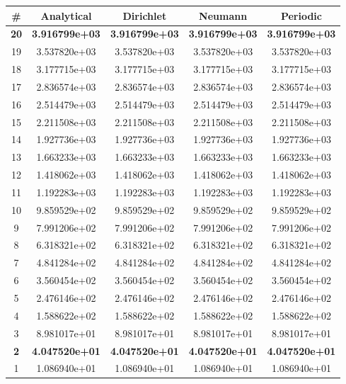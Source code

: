 \begin{tabular}{@{\extracolsep{4pt}}c c c c c}
	\toprule
	\textbf{\#} & \textbf{Analytical} &	  \textbf{Dirichlet} & \textbf{Neumann} & \textbf{Periodic}  \\
	\midrule
		\textbf{20} & \textbf{3.916799e+03} & \textbf{3.916799e+03} & \textbf{3.916799e+03} & \textbf{3.916799e+03} \\
		19 & 3.537820e+03 &	3.537820e+03 & 3.537820e+03 & 3.537820e+03 \\
		18 & 3.177715e+03 &	3.177715e+03 & 3.177715e+03 & 3.177715e+03 \\
		17 & 2.836574e+03 &	2.836574e+03 & 2.836574e+03 & 2.836574e+03 \\
		16 & 2.514479e+03 &	2.514479e+03 & 2.514479e+03 & 2.514479e+03 \\
		15 & 2.211508e+03 &	2.211508e+03 & 2.211508e+03 & 2.211508e+03 \\
		14 & 1.927736e+03 &	1.927736e+03 & 1.927736e+03 & 1.927736e+03 \\
		13 & 1.663233e+03 &	1.663233e+03 & 1.663233e+03 & 1.663233e+03 \\
		12 & 1.418062e+03 &	1.418062e+03 & 1.418062e+03 & 1.418062e+03 \\
		11 & 1.192283e+03 &	1.192283e+03 & 1.192283e+03 & 1.192283e+03 \\
		10 & 9.859529e+02 &	9.859529e+02 & 9.859529e+02 & 9.859529e+02 \\
		9  & 7.991206e+02 &	7.991206e+02 & 7.991206e+02 & 7.991206e+02 \\
		8  & 6.318321e+02 &	6.318321e+02 & 6.318321e+02 & 6.318321e+02 \\
		7  & 4.841284e+02 &	4.841284e+02 & 4.841284e+02 & 4.841284e+02 \\
		6  & 3.560454e+02 &	3.560454e+02 & 3.560454e+02 & 3.560454e+02 \\
		5  & 2.476146e+02 &	2.476146e+02 & 2.476146e+02 & 2.476146e+02 \\
		4  & 1.588622e+02 &	1.588622e+02 & 1.588622e+02 & 1.588622e+02 \\
		3  & 8.981017e+01 &	8.981017e+01 & 8.981017e+01 & 8.981017e+01 \\
		\textbf{2}& \textbf{4.047520e+01} &	\textbf{4.047520e+01} & \textbf{4.047520e+01} & \textbf{4.047520e+01} \\
		1  & 1.086940e+01 &	1.086940e+01 & 1.086940e+01 & 1.086940e+01 \\
	\bottomrule
\end{tabular} 